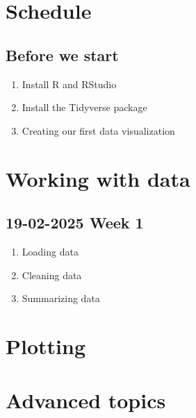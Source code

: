 \documentclass{article}
\begin{document}
\section*{Schedule}

\subsection*{Before we start}
\begin{enumerate}
    \item Install R and RStudio
    \item Install the Tidyverse package
    \item Creating our first data visualization
\end{enumerate}

\section{Working with data}

\subsection*{19-02-2025 \textbf{Week 1}}

\begin{enumerate}
    \item Loading data
    \item Cleaning data
    \item Summarizing data
\end{enumerate}

\section{Plotting}

\section{Advanced topics}
\end{document}
